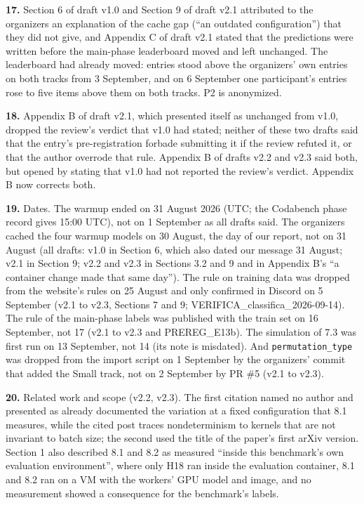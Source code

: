 \noindent\textbf{17.} Section 6 of draft v1.0 and Section 9 of draft v2.1 attributed to the organizers an explanation of the cache gap (``an outdated configuration'') that they did not give, and Appendix C of draft v2.1 stated that the predictions were written before the main-phase leaderboard moved and left unchanged. The leaderboard had already moved: entries stood above the organizers' own entries on both tracks from 3 September, and on 6 September one participant's entries rose to five items above them on both tracks. P2 is anonymized.
\par

\noindent\textbf{18.} Appendix B of draft v2.1, which presented itself as unchanged from v1.0, dropped the review's verdict that v1.0 had stated; neither of these two drafts said that the entry's pre-registration forbade submitting it if the review refuted it, or that the author overrode that rule. Appendix B of drafts v2.2 and v2.3 said both, but opened by stating that v1.0 had not reported the review's verdict. Appendix B now corrects both.
\par

\noindent\textbf{19.} Dates. The warmup ended on 31 August 2026 (UTC; the Codabench phase record gives 15:00 UTC), not on 1 September as all drafts said. The organizers cached the four warmup models on 30 August, the day of our report, not on 31 August (all drafts: v1.0 in Section 6, which also dated our message 31 August; v2.1 in Section 9; v2.2 and v2.3 in Sections 3.2 and 9 and in Appendix B's ``a container change made that same day''). The rule on training data was dropped from the website's rules on 25 August and only confirmed in Discord on 5 September (v2.1 to v2.3, Sections 7 and 9; VERIFICA\_classifica\_2026-09-14). The rule of the main-phase labels was published with the train set on 16 September, not 17 (v2.1 to v2.3 and PREREG\_E13b). The simulation of 7.3 was first run on 13 September, not 14 (its note is misdated). And \texttt{permutation\_type} was dropped from the import script on 1 September by the organizers' commit that added the Small track, not on 2 September by PR \#5 (v2.1 to v2.3).
\par

\noindent\textbf{20.} Related work and scope (v2.2, v2.3). The first citation named no author and presented as already documented the variation at a fixed configuration that 8.1 measures, while the cited post traces nondeterminism to kernels that are not invariant to batch size; the second used the title of the paper's first arXiv version. Section 1 also described 8.1 and 8.2 as measured ``inside this benchmark's own evaluation environment'', where only H18 ran inside the evaluation container, 8.1 and 8.2 ran on a VM with the workers' GPU model and image, and no measurement showed a consequence for the benchmark's labels.
\par


